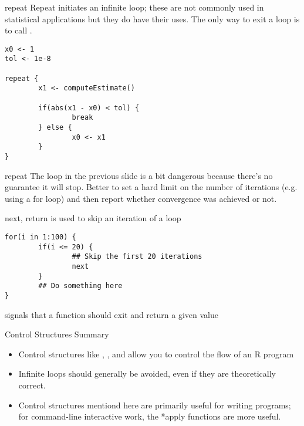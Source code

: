 \documentclass[aspectratio=169]{beamer}
\begin{document}
\begin{frame}[fragile]{repeat}
Repeat initiates an infinite loop; these are not commonly used in
statistical applications but they do have their uses.  The only way to
exit a  loop is to call .
\begin{verbatim}
x0 <- 1
tol <- 1e-8

repeat {
        x1 <- computeEstimate()

        if(abs(x1 - x0) < tol) {
                break
        } else {
                x0 <- x1
        }
}
\end{verbatim}
\end{frame}

\begin{frame}{repeat}
The loop in the previous slide is a bit dangerous because there's no
guarantee it will stop.  Better to set a hard limit on the number of
iterations (e.g. using a for loop) and then report whether convergence
was achieved or not.
\end{frame}

\begin{frame}[fragile]{next, return}
 is used to skip an iteration of a loop
\begin{verbatim}
for(i in 1:100) {
        if(i <= 20) {
                ## Skip the first 20 iterations
                next
        }
        ## Do something here
}
\end{verbatim}
 signals that a function should exit and return a given
value
\end{frame}


\begin{frame}{Control Structures}
Summary
\begin{itemize}
  \item Control structures like , , and 
    allow you to control the flow of an R program
  \item Infinite loops should generally be avoided, even if they are
    theoretically correct.
  \item Control structures mentiond here are primarily useful for
    writing programs; for command-line interactive work, the *apply
    functions are more useful.
\end{itemize}
\end{frame}
\end{document}
